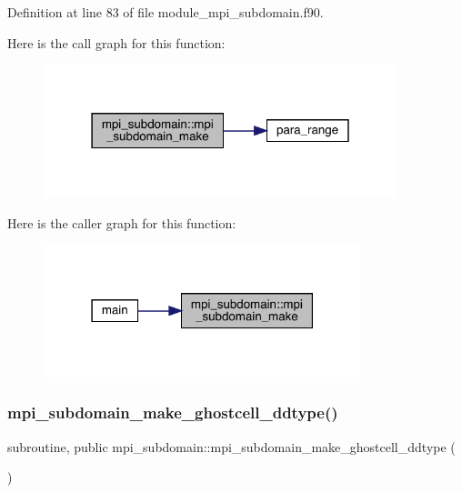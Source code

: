 Definition at line 83 of file module\+\_\+mpi\+\_\+subdomain.\+f90.

Here is the call graph for this function\+:
\nopagebreak
\begin{figure}[H]
\begin{center}
\leavevmode
\includegraphics[width=291pt]{namespacempi__subdomain_a3a1e7cf64aafbebd3c09b92fc56bd311_cgraph}
\end{center}
\end{figure}
Here is the caller graph for this function\+:
\nopagebreak
\begin{figure}[H]
\begin{center}
\leavevmode
\includegraphics[width=262pt]{namespacempi__subdomain_a3a1e7cf64aafbebd3c09b92fc56bd311_icgraph}
\end{center}
\end{figure}
\mbox{\label{namespacempi__subdomain_ad788c273d92ea7058caf0874bffdad6d}} 
\subsubsection{\texorpdfstring{mpi\_subdomain\_make\_ghostcell\_ddtype()}{mpi\_subdomain\_make\_ghostcell\_ddtype()}}
{\footnotesize\ttfamily subroutine, public mpi\+\_\+subdomain\+::mpi\+\_\+subdomain\+\_\+make\+\_\+ghostcell\+\_\+ddtype (\begin{DoxyParamCaption}{ }\end{DoxyParamCaption})}



